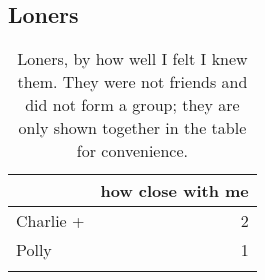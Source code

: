 \subsection{Loners}
\nopagebreak
\begin{table}[ht]
\caption{Loners, by how well I felt I knew them.  They were not friends and did not form a group; they are only shown together in the table for convenience.}\label{append:loners}

	\centering
		\begin{tabular}{lr} \\
		\lsptoprule
			\multirow{2}{*}{\sc name} & \multicolumn{1}{p{1.75cm}}{\centering \sc how close with me}  \\
		\midrule
Charlie + & 2 \\
Polly     & 1 \\
   \lspbottomrule
				\end{tabular}
\end{table}